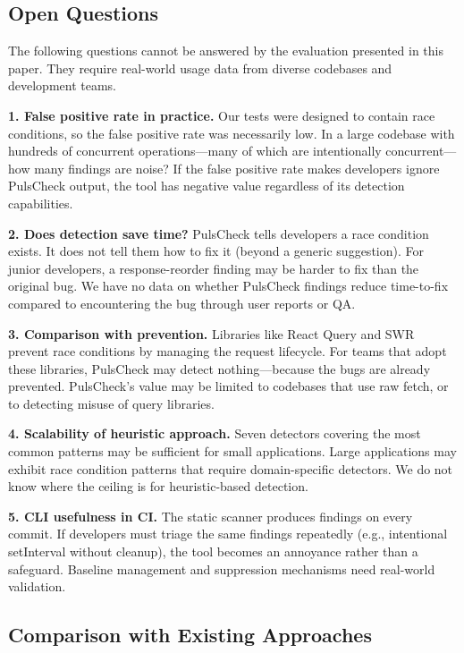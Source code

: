 \documentclass[11pt,a4paper]{article}
\begin{document}
\subsection{Open Questions}

The following questions cannot be answered by the evaluation presented in this paper. They require real-world usage data from diverse codebases and development teams.

\textbf{1. False positive rate in practice.} Our tests were designed to contain race conditions, so the false positive rate was necessarily low. In a large codebase with hundreds of concurrent operations---many of which are intentionally concurrent---how many findings are noise? If the false positive rate makes developers ignore PulsCheck output, the tool has negative value regardless of its detection capabilities.

\textbf{2. Does detection save time?} PulsCheck tells developers a race condition exists. It does not tell them how to fix it (beyond a generic suggestion). For junior developers, a response-reorder finding may be harder to fix than the original bug. We have no data on whether PulsCheck findings reduce time-to-fix compared to encountering the bug through user reports or QA.

\textbf{3. Comparison with prevention.} Libraries like React Query and SWR prevent race conditions by managing the request lifecycle. For teams that adopt these libraries, PulsCheck may detect nothing---because the bugs are already prevented. PulsCheck's value may be limited to codebases that use raw fetch, or to detecting misuse of query libraries.

\textbf{4. Scalability of heuristic approach.} Seven detectors covering the most common patterns may be sufficient for small applications. Large applications may exhibit race condition patterns that require domain-specific detectors. We do not know where the ceiling is for heuristic-based detection.

\textbf{5. CLI usefulness in CI.} The static scanner produces findings on every commit. If developers must triage the same findings repeatedly (e.g., intentional setInterval without cleanup), the tool becomes an annoyance rather than a safeguard. Baseline management and suppression mechanisms need real-world validation.

\subsection{Comparison with Existing Approaches}
\end{document}
